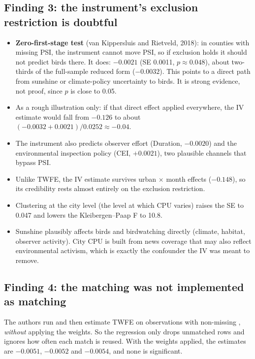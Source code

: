 \documentclass[11pt]{article}
\begin{document}
\subsection{Finding 3: the instrument's exclusion restriction is doubtful}
\begin{itemize}
\item \textbf{Zero-first-stage test} (van Kippersluis and Rietveld, 2018): in counties with missing PSI, the instrument cannot move PSI, so if exclusion holds it should not predict birds there. It does: $-0.0021$ (SE 0.0011, $p\approx0.048$), about two-thirds of the full-sample reduced form ($-0.0032$). This points to a direct path from sunshine or climate-policy uncertainty to birds. It is strong evidence, not proof, since $p$ is close to 0.05.
\item As a rough illustration only: if that direct effect applied everywhere, the IV estimate would fall from $-0.126$ to about $(-0.0032+0.0021)/0.0252\approx-0.04$.
\item The instrument also predicts observer effort (Duration, $-0.0020$) and the environmental inspection policy (CEI, $+0.0021$), two plausible channels that bypass PSI.
\item Unlike TWFE, the IV estimate survives urban $\times$ month effects ($-0.148$), so its credibility rests almost entirely on the exclusion restriction.
\item Clustering at the city level (the level at which CPU varies) raises the SE to 0.047 and lowers the Kleibergen--Paap F to 10.8.
\item Sunshine plausibly affects birds and birdwatching directly (climate, habitat, observer activity). City CPU is built from news coverage that may also reflect environmental activism, which is exactly the confounder the IV was meant to remove.
\end{itemize}

\subsection{Finding 4: the matching was not implemented as matching}
The authors run  and then estimate TWFE on observations with non-missing , \emph{without} applying the weights. So the regression only drops unmatched rows and ignores how often each match is reused. With the weights applied, the estimates are $-0.0051$, $-0.0052$ and $-0.0054$, and none is significant.
\end{document}

